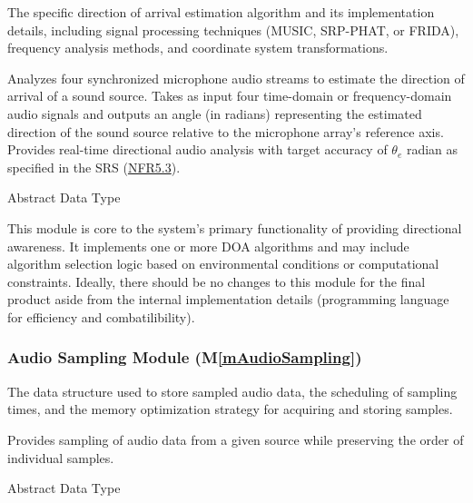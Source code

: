 \documentclass[12pt, titlepage]{article}
\newcommand{\mref}[1]{M\ref{#1}}
\begin{document}
\begin{description}[labelindent=0.5cm]
\item[Secrets:] The specific direction of arrival estimation algorithm and its
  implementation details, including signal processing techniques (MUSIC,
  SRP-PHAT, or FRIDA), frequency analysis methods, and coordinate system
  transformations.
\item[Services:] Analyzes four synchronized microphone audio streams to estimate
  the direction of arrival of a sound source. Takes as input four time-domain or
  frequency-domain audio signals and outputs an angle (in radians) representing
  the estimated direction of the sound source relative to the microphone array's
  reference axis. Provides real-time directional audio analysis with target
  accuracy of \hyperref[SRS-symbol:theta_e]{$\theta_e$} radian as specified in
  the SRS (\hyperref[SRS-NFR5_3]{NFR5.3}).
\item[Implemented By:] \progname{}
\item[Type of Module:] Abstract Data Type
\item[Notes:] This module is core to the system's primary functionality of
  providing directional awareness. It implements one or more DOA algorithms and
  may include algorithm selection logic based on environmental conditions or
  computational constraints. Ideally, there should be no changes to this module
  for the final product aside from the internal implementation details
  (programming language for efficiency and combatilibility).
\end{description}


\subsubsection{Audio Sampling Module (\mref{mAudioSampling})}
\begin{description}[labelindent=0.5cm]
\item[Secrets:] The data structure used to store sampled audio data, the
  scheduling of sampling times, and the memory optimization strategy for
  acquiring and storing samples.
\item[Services:] Provides sampling of audio data from a given source while
  preserving the order of individual samples.
\item[Implemented By:] \progname
\item[Type of Module:] Abstract Data Type
\end{description}
\end{document}
